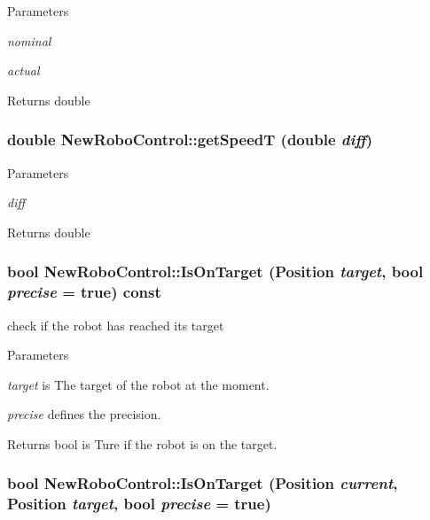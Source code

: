 \begin{DoxyParams}{Parameters}
\item[{\em nominal}]\item[{\em actual}]\end{DoxyParams}
\begin{DoxyReturn}{Returns}
double 
\end{DoxyReturn}
\hypertarget{classNewRoboControl_a0c5f29bb2dee1faf96725b80ddc64398}{
\subsubsection[{getSpeedT}]{\setlength{\rightskip}{0pt plus 5cm}double NewRoboControl::getSpeedT (double {\em diff})}}
\label{classNewRoboControl_a0c5f29bb2dee1faf96725b80ddc64398}

\begin{DoxyParams}{Parameters}
\item[{\em diff}]\end{DoxyParams}
\begin{DoxyReturn}{Returns}
double 
\end{DoxyReturn}
\hypertarget{classNewRoboControl_a77b0e86bef15f3b1fb6cf98d91c6a9b4}{
\subsubsection[{IsOnTarget}]{\setlength{\rightskip}{0pt plus 5cm}bool NewRoboControl::IsOnTarget (Position {\em target}, \/  bool {\em precise} = {\ttfamily true}) const}}
\label{classNewRoboControl_a77b0e86bef15f3b1fb6cf98d91c6a9b4}


check if the robot has reached its target 


\begin{DoxyParams}{Parameters}
\item[{\em target}]is The target of the robot at the moment. \item[{\em precise}]defines the precision. \end{DoxyParams}
\begin{DoxyReturn}{Returns}
bool is Ture if the robot is on the target. 
\end{DoxyReturn}
\hypertarget{classNewRoboControl_a106c7ccc03f05693a07da1235ab0b17f}{
\subsubsection[{IsOnTarget}]{\setlength{\rightskip}{0pt plus 5cm}bool NewRoboControl::IsOnTarget (Position {\em current}, \/  Position {\em target}, \/  bool {\em precise} = {\ttfamily true})}}
\label{classNewRoboControl_a106c7ccc03f05693a07da1235ab0b17f}


